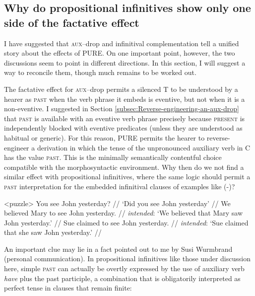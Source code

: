 \documentclass[output=paper]{langscibook}
\begin{document}
\subsection{Why do propositional infinitives show only one side of the factative
effect}

\label{subsec:An-important-unsolved} I have suggested that \textsc{aux}--drop and infinitival complementation tell a unified story about the effects of PURE. On one important point, however, the two discussions seem to point in different directions. In this section, I will suggest a way to reconcile them, though much remains to be worked out. 

The factative effect for \textsc{aux}--drop permits a silenced T to be understood by a hearer as \textsc{past} when the verb phrase it embeds is eventive, but not when it is a non-eventive. I suggested in Section \ref{subsec:Reverse-engineering-an-aux-drop} that \textsc{past} is available with an eventive verb phrase precisely because \textsc{present }is independently blocked with eventive predicates (unless they are understood as habitual or generic). For this reason, PURE permits the hearer to reverse-engineer a derivation in which the tense of the unpronounced auxiliary verb in C has the value \textsc{past. }This is the minimally semantically contentful choice compatible with the morphosyntactic environment. Why then do we not find a similar effect with propositional infinitives, where the same logic should permit a \textsc{past }interpretation for the embedded infinitival clauses of examples like (-)? 

\pex<puzzle>
\a
\begingl
\gla You see John yesterday?  //
\glft `Did you see John yesterday' //
\endgl 
\a 
\begingl 
\gla \ljudge*We believed Mary to see John yesterday.  //
\glft \textit{intended}: `We believed that Mary saw John yesterday.' //
\endgl
\a
\begingl
\gla  \ljudge*Sue claimed to see John yesterday. //
\glft \textit{intended}: `Sue claimed that she saw John yesterday.' //
\endgl
\xe

An important clue may lie in a fact pointed out to me by Susi Wurmbrand (personal communication). In propositional infinitives like those under discussion here, simple \textsc{past} can actually be overtly expressed by the use of auxiliary verb \textit{have} plus the past participle, a combination that is obligatorily interpreted as perfect tense in clauses that remain finite:
\end{document}
